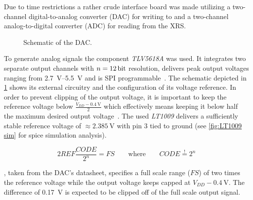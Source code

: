             Due to time restrictions a rather crude interface board was made utilizing a two-channel digital-to-analog converter (DAC) for writing to and a two-channel analog-to-digital converter (ADC) for reading from the XRS.
            \begin{figure}[h]
                \centering
                
                \caption[Schematic of the DAC]{Schematic of the DAC.}
                \label{fig:DAC schematic}
            \end{figure}
            To generate analog signals the component \textit{TLV5618A} was used.
            It integrates two separate output channels with \(n = \qty{12}{\bit}\) resolution, delivers peak output voltages ranging from \qtyrange{2.7}{5.5}{\volt} and is SPI programmable~\cite{Manual.DAC.TLV5618A}.
            The schematic depicted in \cref{fig:DAC schematic} shows its external circuitry and the configuration of its voltage reference.
            In order to prevent clipping of the output voltage, it is important to keep the reference voltage below \(\frac{V_{DD} - \qty{0.4}{\volt}}{2}\) which effectively means keeping it below half the maximum desired output voltage~\cite[p. 3]{Manual.DAC.TLV5618A}.
            The used \textit{LT1009} delivers a sufficiently stable reference voltage of \(\approx \qty{2.385}{\volt}\) with pin 3 tied to ground (see \cref{fig:LT1009 sim} for spice simulation analysis).

            \begin{equation}
                2REF\frac{CODE}{2^n} = FS \qquad \text{where} \qquad CODE \overset{!}{=} 2^n
                \label{eq:dac general function}
            \end{equation}

            , taken from the DAC's datasheet, specifies a full scale range (\(FS\)) of two times the reference voltage while the output voltage keeps capped at \(V_{DD}- \qty{0.4}{\volt}\).
            The difference of \qty{0.17}{\volt} is expected to be clipped off of the full scale output signal.\par\medskip



